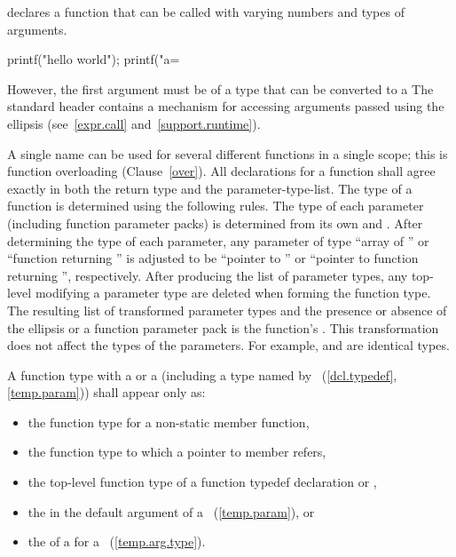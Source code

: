 declares a function that can be called with varying numbers and types of arguments.

\begin{codeblock}
printf("hello world");
printf("a=%
\end{codeblock}

However, the first argument must be of a type
that can be converted to a
\exitexample
\enternote
The standard header
%
contains a mechanism for accessing arguments passed using the ellipsis
(see~\ref{expr.call} and~\ref{support.runtime}).
\exitnote

\pnum
{}%
%
A single name can be used for several different functions in a single scope;
this is function overloading (Clause~\ref{over}).
All declarations for a function shall agree exactly
in both the return type and the parameter-type-list.
The type of a function is determined using the following rules.
The type of each parameter (including function parameter packs) is
determined from its own
and
.
After determining the type of each parameter, any parameter of type ``array of
%
%
''
%
%
or ``function returning
''
is adjusted to be ``pointer to
''
or ``pointer to function returning
'',
respectively.
After producing the list of parameter types,
any top-level
modifying a parameter type are deleted
when forming the function type.
The resulting list of transformed parameter types
and the presence or absence of the ellipsis or a function parameter pack
is the function's
.
\enternote This transformation does not affect the types of the parameters.
For example,  and
 are identical types. \exitnote

\pnum
A function type with a  or a
 (including a type named by
~(\ref{dcl.typedef}, \ref{temp.param}))
shall appear only as:
\begin{itemize}
\item the function type for a non-static member function,

\item the function type to which a pointer to member refers,

\item the top-level function type of a function typedef declaration
or ,

\item the  in the default argument of a
~(\ref{temp.param}), or

\item the  of a  for a
~(\ref{temp.arg.type}).
\end{itemize}
\enterexample

